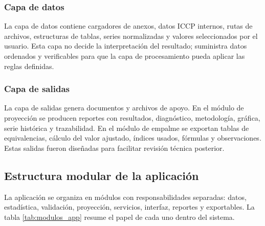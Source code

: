 \documentclass[12pt,letterpaper]{article}
\newcommand{\ICCP}{ICCP}
\begin{document}
\subsubsection{Capa de datos}

La capa de datos contiene cargadores de anexos, datos \ICCP{} internos, rutas de archivos, estructuras de tablas, series normalizadas y valores seleccionados por el usuario. Esta capa no decide la interpretación del resultado; suministra datos ordenados y verificables para que la capa de procesamiento pueda aplicar las reglas definidas.

\subsubsection{Capa de salidas}

La capa de salidas genera documentos y archivos de apoyo. En el módulo de proyección se producen reportes con resultados, diagnóstico, metodología, gráfica, serie histórica y trazabilidad. En el módulo de empalme se exportan tablas de equivalencias, cálculo del valor ajustado, índices usados, fórmulas y observaciones. Estas salidas fueron diseñadas para facilitar revisión técnica posterior.

\subsection{Estructura modular de la aplicación}

La aplicación se organiza en módulos con responsabilidades separadas: datos, estadística, validación, proyección, servicios, interfaz, reportes y exportables. La tabla \ref{tab:modulos_app} resume el papel de cada uno dentro del sistema.
\end{document}
